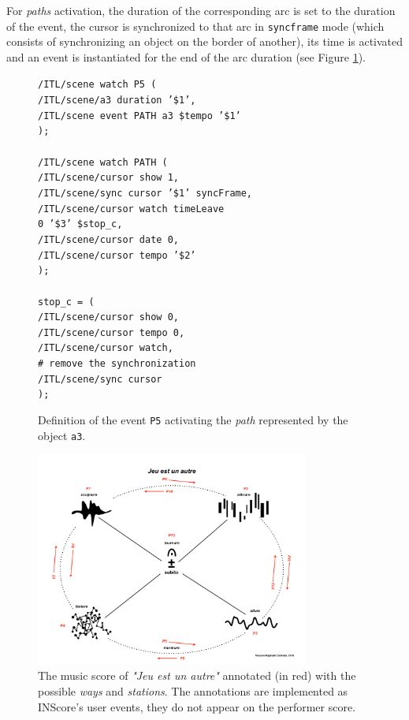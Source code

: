 \documentclass{article}
\newcommand{\OSC}[1]	{{\fontsize{8.5pt}{8pt} \selectfont\texttt{#1}}}
\newcommand{\tab}{\hspace*{4mm}}
\newcommand{\sample}[1]		{\vspace{-0.2em}\begin{center}\colorbox{mygrey}{\begin{minipage}[t]{0.98\columnwidth} {\small \texttt{#1}}\end{minipage}}\end{center}}
\begin{document}
For \emph{paths} activation, the duration of the corresponding arc is set to the duration of the event, the cursor is synchronized to that arc in \OSC{syncframe} mode (which consists of synchronizing an object on the border of another), its time is activated and an event is instantiated for the end of the arc duration (see Figure \ref{fig:path}).
\begin{figure}[h]
   \centering
\sample{/ITL/scene watch P5 ( \\
\tab/ITL/scene/a3 duration '\$1', \\
\tab/ITL/scene event PATH a3 \$tempo '\$1' \\
); \\
\\
/ITL/scene watch PATH ( \\
\tab/ITL/scene/cursor show 1,\\
\tab/ITL/scene/sync cursor '\$1' syncFrame,\\
\tab/ITL/scene/cursor watch timeLeave \\
\hspace*{30mm}0 '\$3' \$stop\_c,\\
\tab/ITL/scene/cursor date 0,\\
\tab/ITL/scene/cursor tempo '\$2'\\
); \\
\\
stop\_c = ( \\
\tab/ITL/scene/cursor show 0,\\
\tab/ITL/scene/cursor tempo 0, \\
\tab/ITL/scene/cursor watch,  \\
\tab\# remove the synchronization \\
\tab/ITL/scene/sync cursor \\
);
}
   \caption{Definition of the event \OSC{P5} activating the \emph{path} represented by the object \OSC{a3}.}
   \label{fig:path}
\end{figure}

\begin{figure}[ht]
   \centering
   \includegraphics[width=0.8\textwidth]{imgs/jeu}
   \caption{The music score of \emph{"Jeu est un autre"} annotated (in red) with the possible \emph{ways} and \emph{stations}. The annotations are implemented as INScore's user events, they do not appear on the performer score.}
   \label{fig:sample}
\end{figure}
\end{document}
